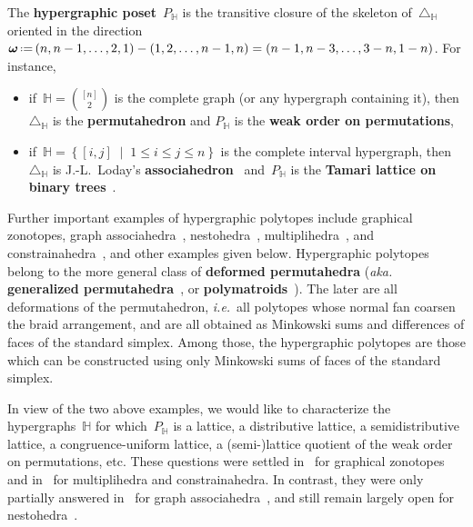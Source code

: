 \documentclass{amsart}
\theoremstyle{definition}
\renewcommand{\b}[1]{\boldsymbol{#1}} %
\newcommand{\set}[2]{\left\{ #1 \;\middle|\; #2 \right\}} %
\newcommand{\eqdef}{\mbox{\,\raisebox{0.2ex}{\scriptsize\ensuremath{\mathrm:}}\ensuremath{=}\,}} %
\newcommand{\simplex}{\triangle} %
\newcommand{\ie}{\textit{i.e.}~} %
\newcommand{\aka}{\textit{aka.}~} %
\newcommand{\defn}[1]{\textbf{\textsf{\color{PineGreen} #1}}} %
\newcommand{\HH}{\mathbb H}  %
\begin{document}
The \defn{hypergraphic poset}~$P_\HH$ is the transitive closure of the skeleton of~$\simplex_\HH$ oriented in the direction~$\b{\omega} \eqdef (n, n-1, \dots, 2, 1) - (1, 2, \dots, n-1, n) = (n-1, n-3, \dots, 3-n, 1-n)$.
For instance, 
\begin{itemize}
\item if~$\HH = \binom{[n]}{2}$ is the complete graph (or any hypergraph containing it), then~$\simplex_\HH$ is the \defn{permutahedron} and $P_\HH$ is the \defn{weak order on permutations},
\item if~$\HH = \set{[i,j]}{1 \le i \le j \le n}$ is the complete interval hypergraph, then~$\simplex_\HH$ is \mbox{J.-L.~Loday's} \defn{associahedron}~\cite{ShniderSternberg,Loday} and~$P_\HH$ is the \defn{Tamari lattice on binary trees}~\cite{Tamari}.
\end{itemize}

Further important examples of hypergraphic polytopes include graphical zonotopes, graph associahedra~\cite{CarrDevadoss}, nestohedra~\cite{FeichtnerSturmfels,Postnikov}, multiplihedra~\cite{Stasheff-HSpaces, SaneblidzeUmble-diagonals, Forcey-multiplihedra, ArdilaDoker, ChapotonPilaud}, and constrainahedra~\cite{BottmanPoliakova, ChapotonPilaud}, and other examples given below.
Hypergraphic polytopes belong to the more general class of \defn{deformed permutahedra} (\aka \defn{generalized permutahedra}~\cite{Postnikov}, or \defn{polymatroids}~\cite{Edmonds}).
The later are all deformations of the permutahedron, \ie all polytopes whose normal fan coarsen the braid arrangement, and are all obtained as Minkowski sums and differences of faces of the standard simplex.
Among those, the hypergraphic polytopes are those which can be constructed using only Minkowski sums of faces of the standard simplex.

In view of the two above examples, we would like to characterize the hypergraphs~$\HH$ for which~$P_\HH$ is a lattice, a distributive lattice, a semidistributive lattice, a congruence-uniform lattice, a \mbox{(semi-)lattice} quotient of the weak order on permutations, etc.
These questions were settled in~\cite{Pilaud-acyclicReorientationLattices} for graphical zonotopes and in~\cite{ChapotonPilaud} for multiplihedra and constrainahedra.
In contrast, they were only partially answered in~\cite{BarnardMcConville} for graph associahedra~\cite{CarrDevadoss}, and still remain largely open for nestohedra~\cite{FeichtnerSturmfels, Postnikov}.
\end{document}
